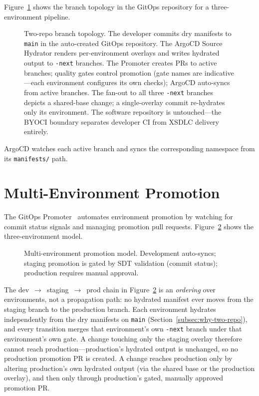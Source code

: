 Figure~\ref{fig:single-repo-branch-flow} shows the branch topology in the GitOps repository for a three-environment pipeline.

\begin{figure}[htbp]
\centering
\resizebox{\textwidth}{!}{%
%
}
\caption{Two-repo branch topology. The developer commits dry manifests to \texttt{main} in the auto-created GitOps repository. The ArgoCD Source Hydrator renders per-environment overlays and writes hydrated output to \texttt{-next} branches. The Promoter creates PRs to active branches; quality gates control promotion (gate names are indicative---each environment configures its own checks); ArgoCD auto-syncs from active branches. The fan-out to all three \texttt{-next} branches depicts a shared-base change; a single-overlay commit re-hydrates only its environment. The software repository is untouched---the BYOCI boundary separates developer CI from XSDLC delivery entirely.}
\label{fig:single-repo-branch-flow}
\end{figure}

ArgoCD watches each active branch and syncs the corresponding namespace from its \texttt{manifests/} path.

\section{Multi-Environment Promotion}
\label{sec:multi-env-promotion}

The GitOps Promoter~\cite{gitops-promoter} automates environment promotion by watching for commit status signals and managing promotion pull requests. Figure~\ref{fig:multi-env-promotion} shows the three-environment model.

\begin{figure}[htbp]
\centering
\resizebox{\textwidth}{!}{%
%
}
\caption{Multi-environment promotion model. Development auto-syncs; staging promotion is gated by SDT validation (commit status); production requires manual approval.}
\label{fig:multi-env-promotion}
\end{figure}

The dev~$\rightarrow$~staging~$\rightarrow$~prod chain in Figure~\ref{fig:multi-env-promotion} is an \textit{ordering} over environments, not a propagation path: no hydrated manifest ever moves from the staging branch to the production branch. Each environment hydrates independently from the dry manifests on \texttt{main} (Section~\ref{subsec:why-two-repo}), and every transition merges that environment's own \texttt{-next} branch under that environment's own gate. A change touching only the staging overlay therefore cannot reach production---production's hydrated output is unchanged, so no production promotion PR is created. A change reaches production only by altering production's own hydrated output (via the shared base or the production overlay), and then only through production's gated, manually approved promotion PR.


